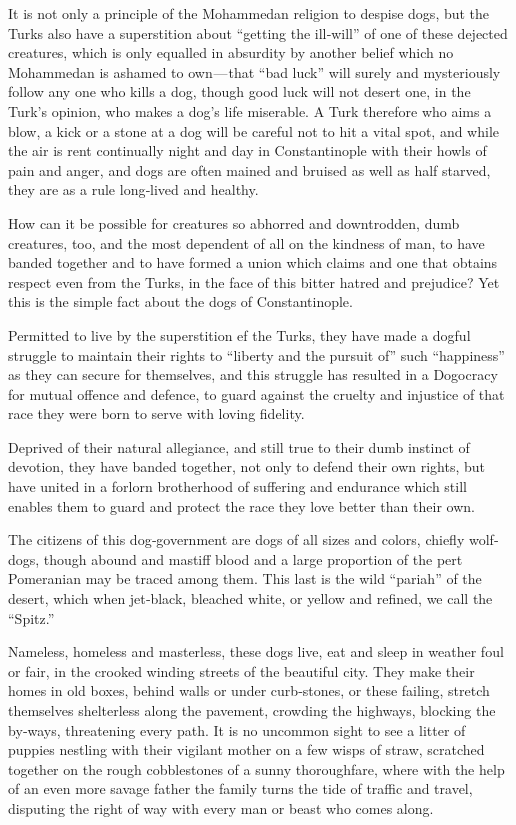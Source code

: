 \documentclass[12pt]{book}
\begin{document}
It is not only a principle of the Mohammedan religion to despise dogs, but
the Turks also have a superstition about “getting the ill‐will” of one of these
dejected creatures, which is only equalled in absurdity by another belief which no
Mohammedan is ashamed to own — that “bad luck” will surely and mysteriously
follow any one who kills a dog, though good luck will not desert one, in the Turk’s
opinion, who makes a dog’s life miserable. A Turk therefore who aims a blow, a
kick or a stone at a dog will be careful not to hit a vital spot, and while the air is
rent continually night and day in Constantinople with their howls of pain and
anger, and dogs are often mained and bruised as well as half starved, they are as
a rule long‐lived and healthy.

How can it be possible for creatures so abhorred and downtrodden, dumb
creatures, too, and the most dependent of all on the kindness of man, to have
banded together and to have formed a union which claims and one that obtains
respect even from the Turks, in the face of this bitter hatred and prejudice? Yet
this is the simple fact about the dogs of Constantinople.

Permitted to live by the superstition ef the Turks, they have made a dogful
struggle to maintain their rights to “liberty and the pursuit of” such “happiness”
as they can secure for themselves, and this struggle has resulted in a Dogocracy
for mutual offence and defence, to guard against the cruelty and injustice of that
race they were born to serve with loving fidelity.

Deprived of their natural allegiance, and still true to their dumb instinct of
devotion, they have banded together, not only to defend their own rights, but have
united in a forlorn brotherhood of suffering and endurance which still enables
them to guard and protect the race they love better than their own.

The citizens of this dog‐government are dogs of all sizes and colors, chiefly
wolf‐dogs, though abound and mastiff blood and a large proportion of the pert
Pomeranian may be traced among them. This last is the wild “pariah” of the
desert, which when jet‐black, bleached white, or yellow and refined, we call the
“Spitz.”

Nameless, homeless and masterless, these dogs live, eat and sleep in weather
foul or fair, in the crooked winding streets of the beautiful city. They make their
homes in old boxes, behind walls or under curb‐stones, or these failing, stretch
themselves shelterless along the pavement, crowding the highways, blocking
the by‐ways, threatening every path. It is no uncommon sight to see a litter of
puppies nestling with their vigilant mother on a few wisps of straw, scratched
together on the rough cobblestones of a sunny thoroughfare, where with the
help of an even more savage father the family turns the tide of traffic and travel,
disputing the right of way with every man or beast who comes along.
\end{document}
